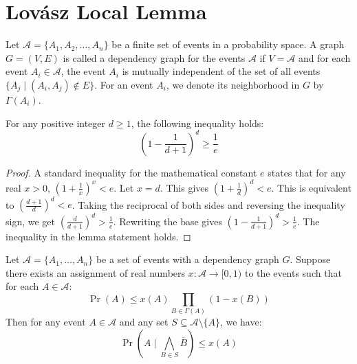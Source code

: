 \chapter{Lovász Local Lemma}

\begin{definition}
    \label{def:Dependency_Graph}
    Let $\mathcal{A} = \{A_1, A_2, \dots, A_n\}$ be a finite set of events in a probability space. A graph $G=(V, E)$ is called a dependency graph for the events $\mathcal{A}$ if $V = \mathcal{A}$ and for each event $A_i \in \mathcal{A}$, the event $A_i$ is mutually independent of the set of all events $\{A_j \mid (A_i, A_j) \notin E\}$. For an event $A_i$, we denote its neighborhood in $G$ by $\Gamma(A_i)$.
\end{definition}

\begin{lemma}
    \label{lem:Inequality_for_e}
    For any positive integer $d \geq 1$, the following inequality holds:
    $$ \left(1 - \frac{1}{d+1}\right)^d \geq \frac{1}{e} $$
\end{lemma}

\begin{proof}
    A standard inequality for the mathematical constant $e$ states that for any real $x > 0$, $\left(1 + \frac{1}{x}\right)^x < e$. Let $x=d$. This gives $\left(1 + \frac{1}{d}\right)^d < e$.
    This is equivalent to $\left(\frac{d+1}{d}\right)^d < e$.
    Taking the reciprocal of both sides and reversing the inequality sign, we get $\left(\frac{d}{d+1}\right)^d > \frac{1}{e}$.
    Rewriting the base gives $\left(1 - \frac{1}{d+1}\right)^d > \frac{1}{e}$. The inequality in the lemma statement holds.
\end{proof}

\begin{lemma}
    \label{lem:Conditional_Probability_Bound}
    Let $\mathcal{A} = \{A_1, \dots, A_n\}$ be a set of events with a dependency graph $G$. Suppose there exists an assignment of real numbers $x: \mathcal{A} \to [0,1)$ to the events such that for each $A \in \mathcal{A}$:
    $$ \Pr(A) \leq x(A) \prod_{B \in \Gamma(A)} (1-x(B)) $$
    Then for any event $A \in \mathcal{A}$ and any set $S \subseteq \mathcal{A} \setminus \{A\}$, we have:
    $$ \Pr\left(A \mid \bigwedge_{B \in S} \overline{B}\right) \leq x(A) $$
\end{lemma}

